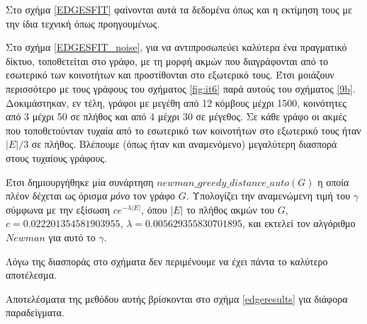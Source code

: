 \documentclass[10pt, letterpaper]{article}
\begin{document}
Στο σχήμα \ref{EDGESFIT} φαίνονται αυτά τα δεδομένα όπως και η εκτίμηση τους με την 
ίδια τεχνική όπως προηγουμένως. 

Στο σχήμα \ref{EDGESFIT_noise}, για να αντιπροσωπεύει καλύτερα ένα πραγματικό δίκτυο,
τοποθετείται  στο γράφο, με τη μορφή ακμών που διαγράφονται από το 
εσωτερικό των κοινοτήτων και προστίθονται στο εξωτερικό τους. Έτσι μοιάζουν περισσότερο
με τους γράφους του σχήματος \ref{fig:it6} παρά αυτούς του σχήματος \ref{9b}. 
Δοκιμάστηκαν, εν τέλη, γράφοι με μεγέθη από 12 κόμβους μέχρι 1500, κοινότητες
από 3 μέχρι 50 σε πλήθος και από 4 μέχρι 30 σε μέγεθος. Σε κάθε γράφο 
οι ακμές που τοποθετούνταν τυχαία από το εσωτερικό των κοινοτήτων στο εξωτερικό τους 
ήταν $|E|/3$ σε πλήθος. Βλέπουμε (όπως ήταν και αναμενόμενο) μεγαλύτερη διασπορά 
στους τυχαίους γράφους. 



Έτσι δημιουργήθηκε μία συνάρτηση $newman\_greedy\_distance\_auto(G)$ η οποία πλέον
δέχεται ως όρισμα \emph{μόνο} τον γράφο $G$. Υπολογίζει την αναμενώμενη τιμή του $\gamma$
σύμφωνα με την εξίσωση $ce^{-\lambda |E|}$, όπου $|E|$ το πλήθος ακμών του $G$, 
$c=0.022201354581903955$, $\lambda = 0.005629355830701895$, και εκτελεί τον αλγόριθμο $Newman$ για αυτό το $\gamma$. 

Λόγω της διασποράς στο σχήματα δεν περιμένουμε να έχει πάντα το καλύτερο
αποτέλεσμα.

Αποτελέσματα της μεθόδου αυτής βρίσκονται στο σχήμα \ref{edgeresults} για διάφορα παραδείγματα. 
\end{document}
